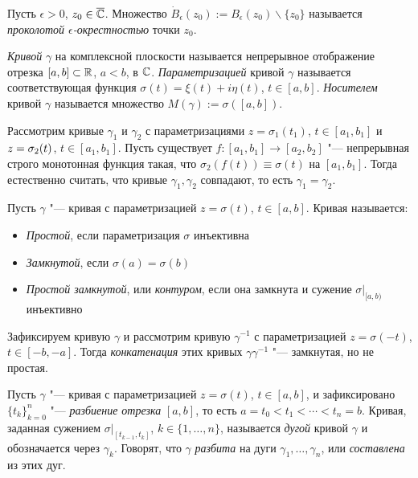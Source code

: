 \begin{definition}
	Пусть $\epsilon > 0$, $z_0 \in \overline{\mathbb{C}}$. Множество $\dot B_\epsilon(z_0) := B_\epsilon(z_0) \backslash \{z_0\}$ называется \textit{проколотой $\epsilon$-окрестностью} точки $z_0$.
\end{definition}

\begin{definition}
	\textit{Кривой} $\gamma$ на комплексной плоскости называется непрерывное отображение отрезка $[a, b] \subset \mathbb{R}$, $a < b$, в $\mathbb{C}$. \textit{Параметризацией} кривой $\gamma$ называется соответствующая 	функция $\sigma(t) = \xi(t) + i\eta(t)$, $t \in [a, b]$. \textit{Носителем} кривой $\gamma$ называется множество $M(\gamma) := \sigma([a, b])$. 
\end{definition}

\begin{note}
	Рассмотрим кривые $\gamma_1$ и $\gamma_2$ с параметризациями $z = \sigma_1(t_1)$, $t \in [a_1, b_1]$ и $z \hm= \sigma_2(t)$, $t \in [a_1, b_1]$. Пусть существует $f : [a_1, b_1] \to [a_2, b_2]$ "--- непрерывная строго монотонная функция такая, что $\sigma_2(f(t)) \equiv \sigma(t)$ на $[a_1, b_1]$. Тогда естественно считать, что кривые $\gamma_1, \gamma_2$ совпадают, то есть $\gamma_1 = \gamma_2$.
\end{note}
\pagebreak

\begin{definition}
	Пусть $\gamma$ "--- кривая с параметризацией $z = \sigma(t)$, $t \in [a, b]$. Кривая называется:
	\begin{itemize}
		\item \textit{Простой}, если параметризация $\sigma$ инъективна
		\item \textit{Замкнутой}, если $\sigma(a) = \sigma(b)$
		\item \textit{Простой замкнутой}, или \textit{контуром}, если она замкнута и сужение $\sigma|_{[a, b)}$ инъективно
	\end{itemize}
\end{definition}

\begin{example}
	Зафиксируем кривую $\gamma$ и рассмотрим кривую $\gamma^{-1}$ с параметризацией $z = \sigma(-t)$, $t \in [-b, -a]$. Тогда \textit{конкатенация} этих кривых $\gamma\gamma^{-1}$ "--- замкнутая, но не простая.
\end{example}

\begin{definition}
	Пусть $\gamma$ "--- кривая с параметризацией $z = \sigma(t)$, $t \in [a, b]$, и зафиксировано $\{t_k\}_{k = 0}^n$ "--- \textit{разбиение отрезка} $[a, b]$, то есть $a = t_0 < t_1 < \dotsb < t_n = b$. Кривая, заданная сужением $\sigma|_{[t_{k-1}, t_k]}$, $k \in \{1, \dotsc, n\}$, называется \textit{дугой} кривой $\gamma$ и обозначается через $\gamma_k$. Говорят, что $\gamma$ \textit{разбита} на дуги $\gamma_1, \dotsc, \gamma_n$, или \textit{составлена} из этих дуг.
\end{definition}

